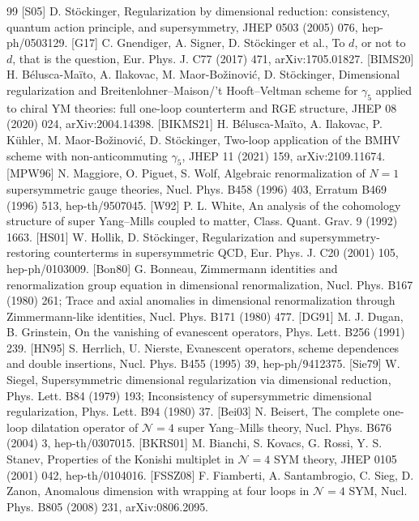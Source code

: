 \begin{thebibliography}{99}
 [S05] D. St\"ockinger, Regularization by dimensional reduction: consistency, quantum action principle, and supersymmetry, JHEP 0503 (2005) 076, hep-ph/0503129.
 [G17] C. Gnendiger, A. Signer, D. St\"ockinger et al., To $d$, or not to $d$, that is the question, Eur. Phys. J. C77 (2017) 471, arXiv:1705.01827.
 [BIMS20] H. B\'elusca-Ma\"ito, A. Ilakovac, M. Ma\dj or-Bo\v zinovi\'c, D. St\"ockinger, Dimensional regularization and Breitenlohner--Maison/'t Hooft--Veltman scheme for $\gamma_5$ applied to chiral YM theories: full one-loop counterterm and RGE structure, JHEP 08 (2020) 024, arXiv:2004.14398.
 [BIKMS21] H. B\'elusca-Ma\"ito, A. Ilakovac, P. K\"uhler, M. Ma\dj or-Bo\v zinovi\'c, D. St\"ockinger, Two-loop application of the BMHV scheme with non-anticommuting $\gamma_5$, JHEP 11 (2021) 159, arXiv:2109.11674.
 [MPW96] N. Maggiore, O. Piguet, S. Wolf, Algebraic renormalization of $N=1$ supersymmetric gauge theories, Nucl. Phys. B458 (1996) 403, Erratum B469 (1996) 513, hep-th/9507045.
 [W92] P. L. White, An analysis of the cohomology structure of super Yang--Mills coupled to matter, Class. Quant. Grav. 9 (1992) 1663.
 [HS01] W. Hollik, D. St\"ockinger, Regularization and supersymmetry-restoring counterterms in supersymmetric QCD, Eur. Phys. J. C20 (2001) 105, hep-ph/0103009.
 [Bon80] G. Bonneau, Zimmermann identities and renormalization group equation in dimensional renormalization, Nucl. Phys. B167 (1980) 261; Trace and axial anomalies in dimensional renormalization through Zimmermann-like identities, Nucl. Phys. B171 (1980) 477.
 [DG91] M. J. Dugan, B. Grinstein, On the vanishing of evanescent operators, Phys. Lett. B256 (1991) 239.
 [HN95] S. Herrlich, U. Nierste, Evanescent operators, scheme dependences and double insertions, Nucl. Phys. B455 (1995) 39, hep-ph/9412375.
 [Sie79] W. Siegel, Supersymmetric dimensional regularization via dimensional reduction, Phys. Lett. B84 (1979) 193; Inconsistency of supersymmetric dimensional regularization, Phys. Lett. B94 (1980) 37.
 [Bei03] N. Beisert, The complete one-loop dilatation operator of $\mathcal N=4$ super Yang--Mills theory, Nucl. Phys. B676 (2004) 3, hep-th/0307015.
 [BKRS01] M. Bianchi, S. Kovacs, G. Rossi, Y. S. Stanev, Properties of the Konishi multiplet in $\mathcal N=4$ SYM theory, JHEP 0105 (2001) 042, hep-th/0104016.
 [FSSZ08] F. Fiamberti, A. Santambrogio, C. Sieg, D. Zanon, Anomalous dimension with wrapping at four loops in $\mathcal N=4$ SYM, Nucl. Phys. B805 (2008) 231, arXiv:0806.2095.

\end{thebibliography}
